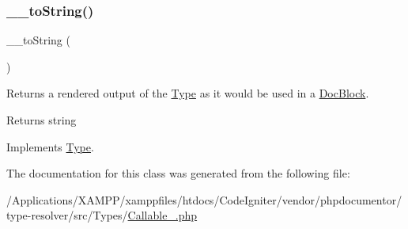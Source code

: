 \subsubsection{\texorpdfstring{\+\_\+\+\_\+to\+String()}{\_\_toString()}}
{\footnotesize\ttfamily \+\_\+\+\_\+to\+String (\begin{DoxyParamCaption}{ }\end{DoxyParamCaption})}

Returns a rendered output of the \mbox{\hyperlink{interfacephp_documentor_1_1_reflection_1_1_type}{Type}} as it would be used in a \mbox{\hyperlink{classphp_documentor_1_1_reflection_1_1_doc_block}{Doc\+Block}}.

\begin{DoxyReturn}{Returns}
string 
\end{DoxyReturn}


Implements \mbox{\hyperlink{interfacephp_documentor_1_1_reflection_1_1_type_a7516ca30af0db3cdbf9a7739b48ce91d}{Type}}.



The documentation for this class was generated from the following file\+:\begin{DoxyCompactItemize}
\item 
/\+Applications/\+X\+A\+M\+P\+P/xamppfiles/htdocs/\+Code\+Igniter/vendor/phpdocumentor/type-\/resolver/src/\+Types/\mbox{\hyperlink{_callable___8php}{Callable\+\_\+.\+php}}\end{DoxyCompactItemize}
